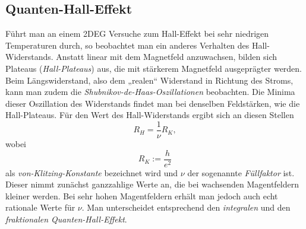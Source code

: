 \subsection{Quanten-Hall-Effekt}
Führt man an einem 2DEG Versuche zum Hall-Effekt bei sehr niedrigen Temperaturen durch, so beobachtet man ein anderes Verhalten des Hall-Widerstands. Anstatt linear mit dem Magnetfeld anzuwachsen, bilden sich Plateaus (\emph{Hall-Plateaus}) aus, die mit stärkerem Magnetfeld ausgeprägter werden. Beim Längswiderstand, also dem „realen“ Widerstand in Richtung des Stroms, kann man zudem die \emph{Shubnikov-de-Haas-Oszillationen} beobachten. Die Minima dieser Oszillation des Widerstands findet man bei denselben Feldstärken, wie die Hall-Plateaus. Für den Wert des Hall-Widerstands ergibt sich an diesen Stellen
$$ R_H = \frac{1}{\nu}R_K,$$
wobei $$R_K := \frac{h}{e^2}$$ als \emph{von-Klitzing-Konstante} bezeichnet wird und $\nu$ der sogenannte \emph{Füllfaktor} ist. Dieser nimmt zunächst ganzzahlige Werte an, die bei wachsenden Magentfeldern kleiner werden. Bei sehr hohen Magentfeldern erhält man jedoch auch echt rationale Werte für $\nu$. Man unterscheidet entsprechend den \emph{integralen} und den \emph{fraktionalen Quanten-Hall-Effekt}.\\

